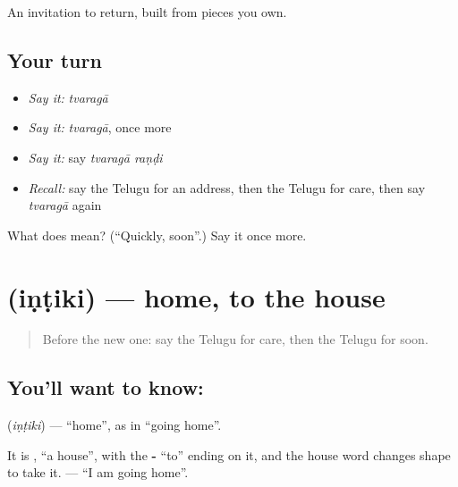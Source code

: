\begin{grammarlens}[title={What you've built}]
An invitation to return, built from pieces you own.
\end{grammarlens}

\subsection*{Your turn}
\begin{itemize}
\raggedright
  \item \emph{Say it:} \emph{tvaragā}
  \item \emph{Say it:} \emph{tvaragā}, once more
  \item \emph{Say it:} say \emph{tvaragā raṇḍi}
  \item \emph{Recall:} say the Telugu for an address, then the Telugu for care, then say \emph{tvaragā} again
\end{itemize}

\begin{tcolorbox}[breakable,colback=teal!4,colframe=teal!35!black,title={Before you move on}]
What does  mean? (\textquotedblleft{}Quickly, soon\textquotedblright{}.) Say it once more.
\end{tcolorbox}
\section[\texorpdfstring{\te{ఇంటికి} (iṇṭiki)}{ఇంటికి (iṇṭiki)}]{ (iṇṭiki) — home, to the house}

\label{lesson:TE-C90-home}



\begin{quote}
Before the new one: say the Telugu for care, then the Telugu for soon.
\end{quote}

\subsection*{You'll want to know: }
\textbf{} (\emph{iṇṭiki}) — \textquotedblleft{}home\textquotedblright{}, as in \textquotedblleft{}going home\textquotedblright{}.

It is \textbf{}, \textquotedblleft{}a house\textquotedblright{}, with the \textbf{-} \textquotedblleft{}to\textquotedblright{} ending on it, and the house word changes shape to take it. \textbf{  } — \textquotedblleft{}I am going home\textquotedblright{}.

